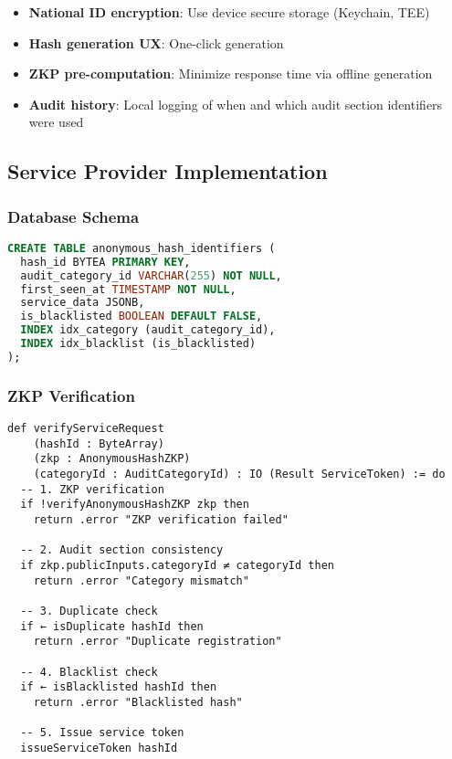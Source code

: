 \begin{itemize}
  \item \textbf{National ID encryption}: Use device secure storage (Keychain, TEE)
  \item \textbf{Hash generation UX}: One-click generation
  \item \textbf{ZKP pre-computation}: Minimize response time via offline generation
  \item \textbf{Audit history}: Local logging of when and which audit section identifiers were used
\end{itemize}

\subsection{Service Provider Implementation}

\subsubsection{Database Schema}

\begin{lstlisting}[language=sql]
CREATE TABLE anonymous_hash_identifiers (
  hash_id BYTEA PRIMARY KEY,
  audit_category_id VARCHAR(255) NOT NULL,
  first_seen_at TIMESTAMP NOT NULL,
  service_data JSONB,
  is_blacklisted BOOLEAN DEFAULT FALSE,
  INDEX idx_category (audit_category_id),
  INDEX idx_blacklist (is_blacklisted)
);
\end{lstlisting}

\subsubsection{ZKP Verification}

\begin{lstlisting}[language=Lean]
def verifyServiceRequest
    (hashId : ByteArray)
    (zkp : AnonymousHashZKP)
    (categoryId : AuditCategoryId) : IO (Result ServiceToken) := do
  -- 1. ZKP verification
  if !verifyAnonymousHashZKP zkp then
    return .error "ZKP verification failed"

  -- 2. Audit section consistency
  if zkp.publicInputs.categoryId ≠ categoryId then
    return .error "Category mismatch"

  -- 3. Duplicate check
  if ← isDuplicate hashId then
    return .error "Duplicate registration"

  -- 4. Blacklist check
  if ← isBlacklisted hashId then
    return .error "Blacklisted hash"

  -- 5. Issue service token
  issueServiceToken hashId
\end{lstlisting}


